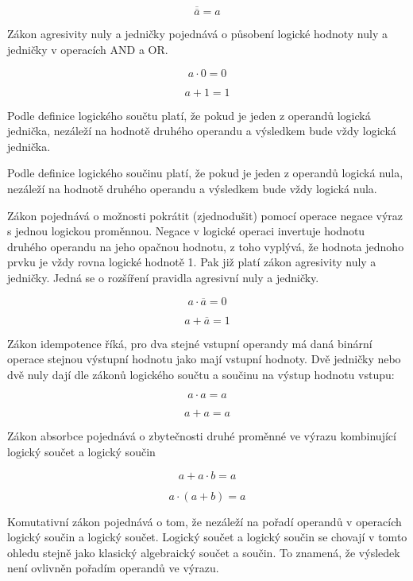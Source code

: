 {$$ \overline{\overline a} = a $$


Zákon agresivity nuly a jedničky pojednává o působení logické hodnoty nuly a jedničky v operacích AND a OR.

$$ a \cdot 0 = 0 $$

$$ a + 1 = 1 $$

Podle definice logického součtu platí, že pokud je jeden z operandů logická jednička, nezáleží na hodnotě druhého operandu a výsledkem bude vždy logická jednička.

Podle definice logického součinu platí, že pokud je jeden z operandů logická nula, nezáleží na hodnotě druhého operandu a výsledkem bude vždy logická nula.


Zákon pojednává o možnosti pokrátit (zjednodušit) pomocí operace negace výraz s jednou logickou proměnnou. Negace v logické operaci invertuje hodnotu druhého operandu na jeho opačnou hodnotu, z toho vyplývá, že hodnota jednoho prvku je vždy rovna logické hodnotě 1. Pak již platí zákon agresivity nuly a jedničky. Jedná se o rozšíření pravidla agresivní nuly a jedničky.

$$ a \cdot \overline a = 0 $$

$$ a + \overline a = 1 $$


Zákon idempotence říká, pro dva stejné vstupní operandy má daná binární operace stejnou výstupní hodnotu jako mají vstupní hodnoty.
Dvě jedničky nebo dvě nuly dají dle zákonů logického součtu a součinu na výstup hodnotu vstupu:

$$ a \cdot a = a $$

$$ a + a = a $$
 


Zákon absorbce pojednává o zbytečnosti druhé proměnné ve výrazu kombinující logický součet a logický součin

$$ a + a \cdot b = a $$

$$ a \cdot (a + b)  = a $$


Komutativní zákon pojednává o tom, že nezáleží na pořadí operandů v operacích logický součin a logický součet. Logický součet a logický součin se chovají v tomto ohledu stejně jako klasický algebraický součet a součin. To znamená, že výsledek není ovlivněn pořadím operandů ve výrazu.

}
